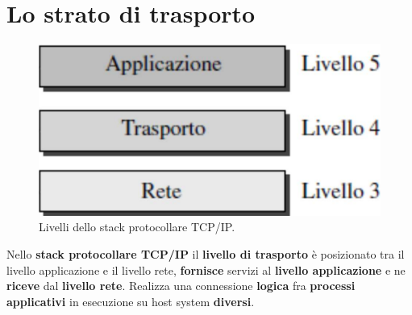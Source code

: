 \documentclass[11pt,a4paper,oneside]{book}
\theoremstyle{definition}
\begin{document}
\section{Lo strato di trasporto}
\begin{figure}[!h]
	\includegraphics[scale=0.3]{Immagini/App_tr_rete.png}
	\centering
	\caption{Livelli dello stack protocollare TCP/IP.}
\end{figure}
Nello \textbf{stack protocollare TCP/IP} il \textbf{livello di trasporto} è posizionato tra il livello applicazione e il livello rete, \textbf{fornisce} servizi al \textbf{livello applicazione} e ne \textbf{riceve} dal \textbf{livello rete}. Realizza una connessione \textbf{logica} fra \textbf{processi applicativi} in esecuzione su host system \textbf{diversi}.

\pagebreak
\end{document}
